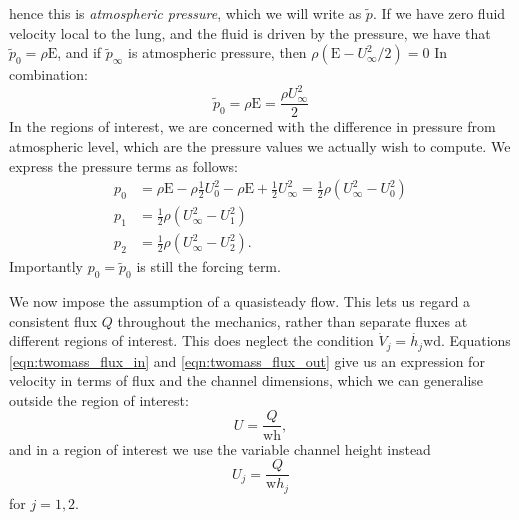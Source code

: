 hence this is \textit{atmospheric pressure}, which we will write as \({\tilde{p}}\).
If we have zero fluid velocity local to the lung, and the fluid is driven by the pressure,
we have that $\tilde{p}_0 = \rho \mathrm{E}$,
and if $\tilde{p}_\infty$ is atmospheric pressure, then $\rho(\mathrm{E} - U_\infty^2/2) = 0$
In combination:
\begin{equation}
    \tilde{p}_0 = \rho \mathrm{E} = \frac{\rho U_\infty^2}{2}
\end{equation}
In the regions of interest, we are concerned with the difference in pressure from atmospheric level,
which are the pressure values we actually wish to compute.
We express the pressure terms as follows:
\begin{equation}
    \begin{aligned}
        p_0 &= \rho\mathrm{E} - \rho\frac{1}{2}U_0^2 - \rho\mathrm{E} + \frac{1}{2}U_\infty^2 = \frac{1}{2}\rho\left(U_\infty^2 - U_0^2\right) \\
        p_1 &= \frac{1}{2}\rho\left(U_\infty^2 - U_1^2\right) \\
        p_2 &= \frac{1}{2}\rho\left(U_\infty^2 - U_2^2\right).
    \end{aligned}
\end{equation}
Importantly \(p_0 = \tilde{p}_0\) is still the forcing term.


We now impose the assumption of a quasisteady flow.
This lets us regard a consistent flux $Q$ throughout the mechanics,
rather than separate fluxes at different regions of interest.
This does neglect the condition $\dot{V}_j = \dot{h_j}\mathrm{wd}$.
Equations \ref{eqn:twomass_flux_in} and \ref{eqn:twomass_flux_out} give us an expression for velocity in terms of flux and the channel dimensions,
which we can generalise outside the region of interest:
\begin{equation}
    U = \frac{Q}{\mathrm{wh}},
\end{equation}
and in a region of interest we use the variable channel height instead
\begin{equation}
    U_j = \frac{Q}{\mathrm{w}h_j}
\end{equation}
for \(j=1,2\).

